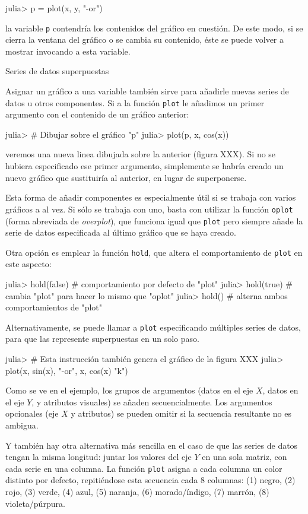 ﻿\documentclass{article}
\newcommand{\code}{\texttt}
\begin{document}
julia> p = plot(x, y, "-or")

la variable \code{p} contendría los contenidos del gráfico en cuestión. De este modo, si se cierra la ventana del gráfico o se cambia su contenido, éste se puede volver a mostrar invocando a esta variable.


Series de datos superpuestas

Asignar un gráfico a una variable también sirve para añadirle nuevas series de datos u otros componentes. Si a la función \code{plot} le añadimos un primer argumento con el contenido de un gráfico anterior:

julia> # Dibujar sobre el gráfico "p"
julia> plot(p, x, cos(x))

veremos una nueva linea dibujada sobre la anterior (figura XXX). Si no se hubiera especificado ese primer argumento, simplemente se habría creado un nuevo gráfico que sustituiría al anterior, en lugar de superponerse.

Esta forma de añadir componentes es especialmente útil si se trabaja con varios gráficos a al vez. Si sólo se trabaja con uno, basta con utilizar la función \code{oplot} (forma abreviada de \emph{overplot}), que funciona igual que \code{plot} pero siempre añade la serie de datos especificada al último gráfico que se haya creado.

Otra opción es emplear la función \code{hold}, que altera el comportamiento de \code{plot} en este aspecto:

julia> hold(false) # comportamiento por defecto de "plot"
julia> hold(true)  # cambia "plot" para hacer lo mismo que "oplot"
julia> hold()      # alterna ambos comportamientos de "plot"

Alternativamente, se puede llamar a \code{plot} especificando múltiples series de datos, para que las represente superpuestas en un solo paso.

julia> # Esta instrucción también genera el gráfico de la figura XXX
julia> plot(x, sin(x), "-or", x, cos(x) "k")

Como se ve en el ejemplo, los grupos de argumentos (datos en el eje $X$, datos en el eje $Y$, y atributos visuales) se añaden secuencialmente. Los argumentos opcionales (eje $X$ y atributos) se pueden omitir si la secuencia resultante no es ambigua.

Y también hay otra alternativa más sencilla en el caso de que las series de datos tengan la misma longitud: juntar los valores del eje $Y$ en una sola matriz, con cada serie en una columna. La función \code{plot} asigna a cada columna un color distinto por defecto, repitiéndose esta secuencia cada 8 columnas: (1) negro, (2) rojo, (3) verde, (4) azul, (5) naranja, (6) morado/índigo, (7) marrón, (8) violeta/púrpura.
\end{document}
